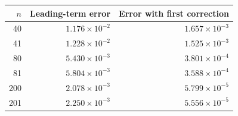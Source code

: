 \begin{tabular}{rrr}
\toprule
$n$ & Leading-term error & Error with first correction \\
\midrule
40 & $1.176\times10^{-2}$ & $1.657\times10^{-3}$ \\
41 & $1.228\times10^{-2}$ & $1.525\times10^{-3}$ \\
80 & $5.430\times10^{-3}$ & $3.801\times10^{-4}$ \\
81 & $5.804\times10^{-3}$ & $3.588\times10^{-4}$ \\
200 & $2.078\times10^{-3}$ & $5.799\times10^{-5}$ \\
201 & $2.250\times10^{-3}$ & $5.556\times10^{-5}$ \\
\bottomrule
\end{tabular}
